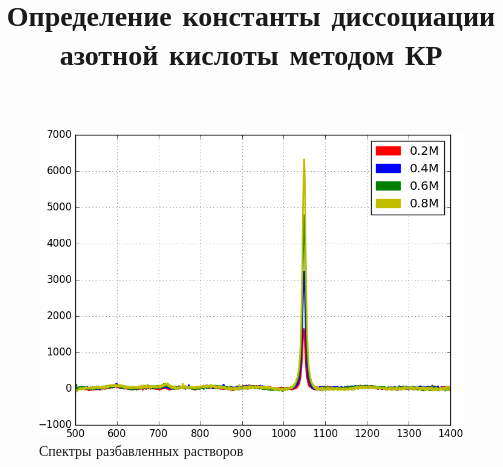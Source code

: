 \documentclass[13pt]{extarticle}
\begin{document}
\title{Определение константы диссоциации азотной кислоты методом КР}
\date{}

\maketitle

\vspace*{-2cm}

\begin{figure}[!ht]
	\centering
	\includegraphics[scale=0.5]{../dilute.png}
	\caption{Спектры разбавленных растворов}
\end{figure}
\end{document}
